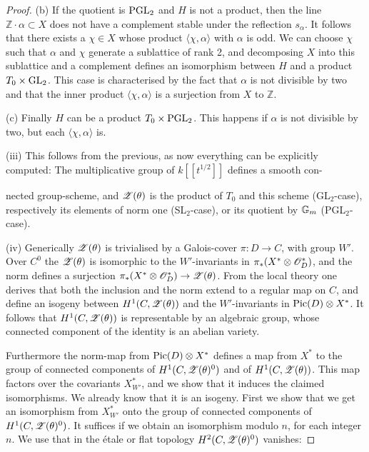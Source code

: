 \documentclass[12pt,english]{smfart}
\theoremstyle{plain} \newtheorem{innerthm}{Theorem} \newtheorem{innerlem}{Lemma} \newtheorem{innerprop}{Proposition} \newtheorem{innercor}{Corollary} \theoremstyle{definition} \newtheorem{innerdefn}{Definition} \newtheorem{innerconstr}{Construction} \theoremstyle{remark} \newtheorem*{remark}{Remark} \newtheorem*{remarks}{Remarks} \newtheorem*{applications}{Applications}
\begin{document}
\begin{proof}
(b) If the quotient is $\operatorname{PGL}_2$ and $H$ is not a product, then the line $\mathbb{Z}\cdot\alpha\subset X$ does not have a complement stable under the reflection $s_\alpha$. It follows that there exists a $\chi\in X$ whose product $\langle\chi,\alpha\rangle$ with $\alpha$ is odd. We can choose $\chi$ such that $\alpha$ and $\chi$ generate a sublattice of rank 2, and decomposing $X$ into this sublattice and a complement defines an isomorphism between $H$ and a product $T_0\times\operatorname{GL}_2$. This case is characterised by the fact that $\alpha$ is not divisible by two and that the inner product $\langle\chi,\alpha\rangle$ is a surjection from $X$ to $\mathbb{Z}$.

(c) Finally $H$ can be a product $T_0\times\operatorname{PGL}_2$. This happens if $\alpha$ is not divisible by two, but each $\langle\chi,\alpha\rangle$ is.

(iii) This follows from the previous, as now everything can be explicitly computed: The multiplicative group of $k[\![t^{1/2}]\!]$ defines a smooth con-


nected group-scheme, and $\mathscr{Z}(\theta)$ is the product of $T_0$ and this scheme (GL$_2$-case), respectively its elements of norm one (SL$_2$-case), or its quotient by $\mathbb{G}_m$ (PGL$_2$-case).

(iv) Generically $\mathscr{Z}(\theta)$ is trivialised by a Galois-cover $\pi\colon D\to C$, with group $W'$. Over $C^0$ the $\mathscr{Z}(\theta)$ is isomorphic to the $W'$-invariants in $\pi_*(X^*\otimes\mathscr{O}_D^*)$, and the norm defines a surjection $\pi_*(X^*\otimes\mathscr{O}_D^*)\to\mathscr{Z}(\theta)$. From the local theory one derives that both the inclusion and the norm extend to a regular map on $C$, and define an isogeny between $H^1(C,\mathscr{Z}(\theta))$ and the $W'$-invariants in $\operatorname{Pic}(D)\otimes X^*$. It follows that $H^1(C,\mathscr{Z}(\theta))$ is representable by an algebraic group, whose connected component of the identity is an abelian variety.

Furthermore the norm-map from $\operatorname{Pic}(D)\otimes X^*$ defines a map from $X^*$ to the group of connected components of $H^1(C,\mathscr{Z}(\theta)^0)$ and of $H^1(C,\mathscr{Z}(\theta))$. This map factors over the covariants $X^*_{W'}$, and we show that it induces the claimed isomorphisms. We already know that it is an isogeny. First we show that we get an isomorphism from $X^*_{W'}$ onto the group of connected components of $H^1(C,\mathscr{Z}(\theta)^0)$. It suffices if we obtain an isomorphism modulo $n$, for each integer $n$. We use that in the \'etale or flat topology $H^2(C,\mathscr{Z}(\theta)^0)$ vanishes:


\end{proof}
\end{document}
